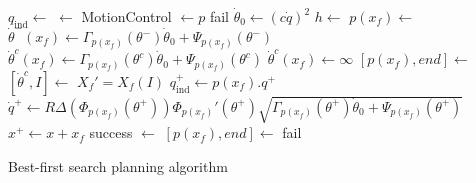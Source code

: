 \begin{algorithm}
	\begin{algorithmic}[1]
			\State $q_{\mathrm{ind}} \gets$ 
			\State [$p$, success]$\gets$ 
				\State MotionControl $\gets p$
			\Else
				\State \Return fail
			\EndIf
		\EndFunction
			\State $\dot{\theta}_0 \gets \left(c\dot{q}\right)^2$
				\State $h \gets$ 
				\State $p(x_f) \gets$ 
			\EndFor
					\State $\dot{\theta}^-(x_f) \gets \Gamma_{p(x_f)}(\theta^-)\dot{\theta}_0 + \Psi_{p(x_f)}(\theta^-)$
						\State $\dot{\theta}^c(x_f) \gets \Gamma_{p(x_f)}(\theta^c)\dot{\theta}_0 + \Psi_{p(x_f)}(\theta^c)$
					\Else
						\State $\dot{\theta}^c(x_f) \gets \infty$
						\State $[p(x_f),end] \gets$ 
					\EndIf
				\EndFor
				\State $[\dot{\theta}^c,I] \gets$ 
				\State $X_f' = X_f(I)$ 
						\State {}
						\State $q^+_{\mathrm{ind}} \gets p(x_f).q^+$
						\State $\dot{q}^+ \gets R\Delta\left(\Phi_{p(x_f)}(\theta^+)\right)\Phi_{p(x_f)}'(\theta^+)\sqrt{\Gamma_{p(x_f)}(\theta^+)\dot{\theta}_0 + \Psi_{p(x_f)}(\theta^+)}$
						\State $x^+ \gets x + x_f$
						\State success $\gets$ 
							\State \Return [$p(x_f)$, success]
						\EndIf
					\EndIf
					\State $[p(x_f),end] \gets$ 
				\EndFor
					\State \Return fail
				\EndIf
			\EndWhile
		\EndFunction
	\end{algorithmic}
	\caption{Best-first search planning algorithm}
	\label{alg:bestfirstsearch}
\end{algorithm}

